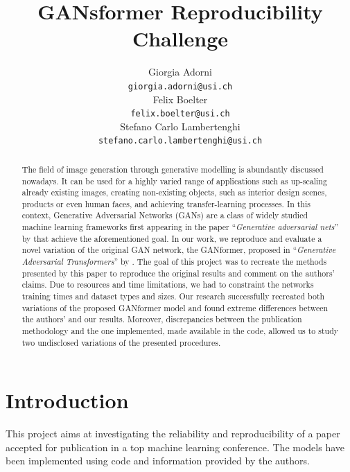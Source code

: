 \documentclass{article}
\title{GANsformer Reproducibility Challenge}
\author{%
Giorgia Adorni \\
\texttt{giorgia.adorni@usi.ch} \\
\And
Felix Boelter\\
\texttt{felix.boelter@usi.ch}\\
\And
Stefano Carlo Lambertenghi\\
\texttt{stefano.carlo.lambertenghi@usi.ch}\\
}
\begin{document}
\maketitle
\begin{abstract}
	The field of image generation through generative modelling is abundantly discussed nowadays. It 
	can be used for a highly varied range of applications such as up-scaling 
	already existing images, creating non-existing objects, such as interior design scenes,
	products or even human faces, and achieving transfer-learning processes. 
	In this context, Generative Adversarial Networks (GANs) are a class of widely studied machine 
	learning frameworks first appearing in the paper ``\emph{Generative adversarial nets}'' by 
	\citet{goodfellow2014generative} that achieve the aforementioned goal. 
	In our work, we reproduce and evaluate a novel variation of the original GAN network, the 
	GANformer, proposed in ``\emph{Generative Adversarial Transformers}'' by 
	\citet{hudson2021generative}. 
	The goal of this project was to recreate the methods presented by this paper to reproduce the 
	original results and comment on the authors’ claims. 
	Due to resources and time limitations, we had to constraint the networks training times and 
	dataset types and sizes. 
	Our research successfully recreated both variations of the proposed GANformer model and found 
	extreme differences between the authors’ and our results. 
	Moreover, discrepancies between the publication methodology and the one implemented, 
	made available in the code, allowed us to study two undisclosed variations of the presented 
	procedures.
\end{abstract}

\section{Introduction}
This project aims at investigating the reliability and reproducibility of a paper accepted 
for publication in a top machine learning conference. The models have been implemented 
using code and information provided by the authors.
\end{document}
